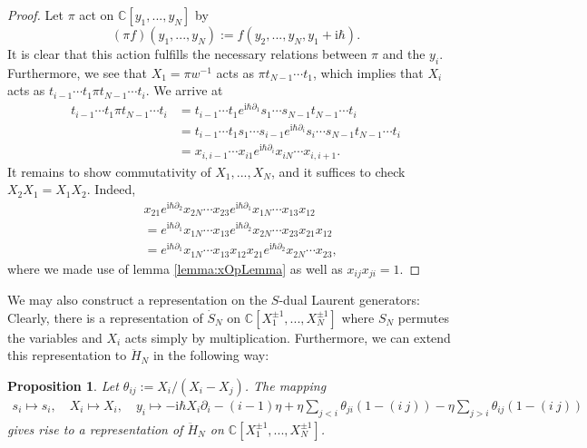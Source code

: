 \documentclass[11pt]{report}
\newtheorem{prop}[theorem]{Proposition}
\theoremstyle{definition}
\theoremstyle{remark}
\theoremstyle{remark}
\newcommand{\C}{\mathbb{C}}
\newcommand{\I}{\mathrm{i}}
\begin{document}
\begin{proof}
Let $\pi$ act on $\C[y_1,...,y_N]$ by
\begin{equation*}
(\pi f)(y_1,...,y_N) := f(y_2,...,y_N,y_1 + \I \hbar).
\end{equation*}
It is clear that this action fulfills the necessary relations between $\pi$ and the $y_i$. Furthermore, we see that $X_1 = \pi w^{-1}$ acts as $\pi t_{N-1} \cdots t_1$, which implies that $X_i$ acts as $t_{i-1} \cdots t_1 \pi t_{N-1} \cdots t_i$. We arrive at
\begin{align*}
t_{i-1} \cdots t_1 \pi t_{N-1} \cdots t_i
&= t_{i-1} \cdots t_1 e^{\I \hbar \partial_1} s_1 \cdots s_{N-1} t_{N-1} \cdots t_i \\
&= t_{i-1} \cdots t_1 s_1 \cdots s_{i-1} e^{\I \hbar \partial_i} s_i \cdots s_{N-1} t_{N-1} \cdots t_i \\
&= x_{i,i-1} \cdots x_{i1} e^{\I \hbar \partial_i} x_{iN} \cdots x_{i,i+1}.
\end{align*}
It remains to show commutativity of $X_1,...,X_N$, and it suffices to check $X_2 X_1 = X_1 X_2$. Indeed,
\begin{align*}
&x_{21} e^{\I\hbar \partial_2} x_{2N} \cdots x_{23} e^{\I\hbar \partial_1} x_{1N} \cdots x_{13} x_{12} \\
&= e^{\I\hbar \partial_1} x_{1N} \cdots x_{13} e^{\I\hbar \partial_2} x_{2N} \cdots x_{23} x_{21} x_{12} \\
&= e^{\I\hbar \partial_1} x_{1N} \cdots x_{13} x_{12} x_{21} e^{\I\hbar \partial_2} x_{2N} \cdots x_{23},
\end{align*}
where we made use of lemma \ref{lemma:xOpLemma} as well as $x_{ij} x_{ji} = 1$.
\end{proof}

We may also construct a representation on the $S$-dual Laurent generators: Clearly, there is a representation of $\dot S_N$ on $\C[X_1^{\pm 1},...,X_N^{\pm 1}]$ where $S_N$ permutes the variables and $X_i$ acts simply by multiplication. Furthermore, we can extend this representation to $\ddot H_N$ in the following way:

\begin{prop}\label{prop:trigCMRepresentation}
Let $\theta_{ij} := X_i/(X_i-X_j)$. The mapping
\begin{align*}
s_i \mapsto s_i, \quad X_i \mapsto X_i, \quad y_i \mapsto -\I \hbar X_i \partial_i - (i-1) \eta + \eta \sum_{j < i} \theta_{ji} (1-(i \ j)) - \eta \sum_{j > i} \theta_{ij} (1-(i \ j))
\end{align*}
gives rise to a representation of $\ddot H_N$ on $\C[X_1^{\pm 1},...,X_N^{\pm 1}]$.
\end{prop}
\end{document}
